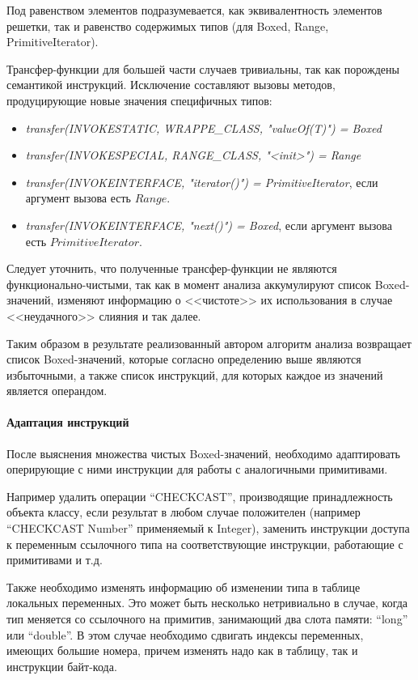 Под равенством элементов подразумевается, как эквивалентность элементов решетки, так и равенство
содержимых типов (для Boxed, Range, PrimitiveIterator).

Трансфер-функции для большей части случаев тривиальны, так как порождены семантикой инструкций.
Исключение составляют вызовы методов, продуцирующие новые значения специфичных типов:
\begin{itemize}
    \item \textit{transfer(INVOKESTATIC, WRAPPE\_CLASS, "valueOf(T)") = Boxed}
    \item \textit{transfer(INVOKESPECIAL, RANGE\_CLASS, "<init>") = Range}
    \item \textit{transfer(INVOKEINTERFACE, "iterator()") = PrimitiveIterator}, если аргумент вызова есть $Range$.
    \item \textit{transfer(INVOKEINTERFACE, "next()") = Boxed}, если аргумент вызова есть $PrimitiveIterator$.
\end{itemize}

Следует уточнить, что полученные трансфер-функции не являются функционально-чистыми, так как
в момент анализа аккумулируют список Boxed-значений, изменяют информацию о <<чистоте>> их
использования в случае <<неудачного>> слияния и так далее.

Таким образом в результате реализованный автором алгоритм анализа возвращает список Boxed-значений,
которые согласно определению выше являются избыточными, а также список инструкций, для
которых каждое из значений является операндом.

\paragraph{Адаптация инструкций}
После выяснения множества чистых Boxed-значений, необходимо адаптировать оперирующие
с ними инструкции для работы с аналогичными примитивами.

Например удалить операции ``CHECKCAST'', производящие принадлежность объекта классу, если результат
в любом случае положителен (например ``CHECKCAST Number'' применяемый к Integer), заменить
инструкции доступа к переменным ссылочного типа на соответствующие инструкции, работающие
с примитивами и т.д.

Также необходимо изменять информацию об изменении типа в таблице локальных переменных.
Это может быть несколько нетривиально в случае, когда тип меняется со ссылочного на примитив,
занимающий два слота памяти: ``long'' или ``double''.
В этом случае необходимо сдвигать индексы переменных, имеющих большие номера, причем изменять надо
как в таблицу, так и инструкции байт-кода.

